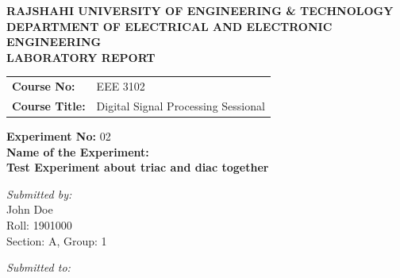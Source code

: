 \documentclass[12pt,a4paper]{article}
\begin{document}
\begin{titlepage}
    \sffamily
    \centering
    \vspace*{1cm}
    
    \Large \textbf{\MakeUppercase{ Rajshahi University of Engineering \& Technology }} \\
    \vspace{0.5cm}
    \large \textbf{\MakeUppercase{ Department of Electrical and Electronic Engineering }} \\
    
    \vspace{2.5cm}
    \Large \textbf{LABORATORY REPORT} \\
    \vspace{1cm}
    
    \begin{tabular}{ll}
        \textbf{Course No:} & EEE 3102 \\
        \textbf{Course Title:} & Digital Signal Processing Sessional \\
    \end{tabular}
    
    \vspace{2cm}
    
    \textbf{Experiment No:} 02 \\
    \vspace{0.5cm}
    \textbf{Name of the Experiment:} \\
    \Large \textbf{ Test Experiment about triac and diac together } \\
    
    \vspace{2.5cm}
    
    \begin{minipage}[t]{0.4\textwidth}
        \begin{flushleft} \large
            \emph{Submitted by:}\\
            John Doe \\
            Roll: 1901000 \\
            Section: A, Group: 1
        \end{flushleft}
    \end{minipage}
    \hfill
    \begin{minipage}[t]{0.5\textwidth}
        \begin{flushright} \large
            \emph{Submitted to:} \\
            

\end{flushright}
\end{minipage}
\end{titlepage}
\end{document}
